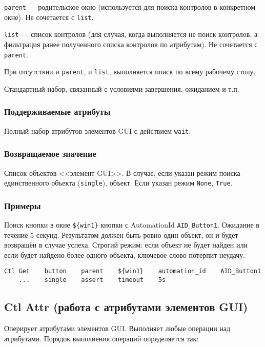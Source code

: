 \documentclass[11pt]{book} %
\begin{document}
\verb|parent| --- родительское окно (используется для поиска контролов в конкретном окне). Не сочетается с \verb|list|.

\verb|list| --- список контролов (для случая, когда выполняется не поиск контролов, а фильтрация ранее полученного списка контролов по атрибутам). Не сочетается с \verb|parent|.

При отсутствии и \verb|parent|, и \verb|list|, выполняется поиск по всему рабочему столу.

Стандартный набор, связанный с условиями завершения, ожиданием и т.п.

\subsubsection*{Поддерживаемые атрибуты} 

Полный набор атрибутов элементов GUI с действием \verb|wait|.

\subsubsection*{Возвращаемое значение} 
Список объектов <<элемент GUI>>. В случае, если указан режим поиска единственного объекта (\verb|single|), объект. Если указан режим \verb|None|, \verb|True|.

\subsubsection*{Примеры}

Поиск кнопки в окне \verb|${win1}| кнопки с AutomationId \verb|AID_Button1|. Ожидание в течение 5 секунд. Результатом должен быть ровно один объект, он и будет возвращён в случае успеха. Строгий режим: если объект не будет найден или если будет найдено более одного объекта, ключевое слово потерпит неудачу.

\begin{verbatim}Ctl Get    button    parent    ${win1}    automation_id    AID_Button1
    ...    single    assert    timeout    5s\end{verbatim}
    


\subsection{Ctl Attr (работа с атрибутами элементов GUI)}
Оперирует атрибутами элементов GUI. Выполняет любые операции над атрибутами. Порядок выполнения операций определяется так:
\end{document}
